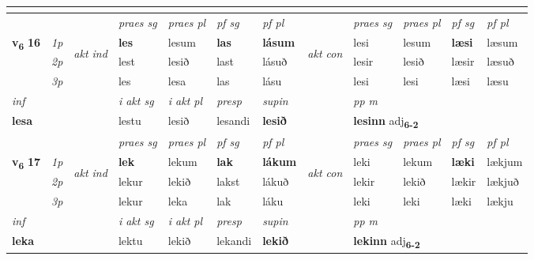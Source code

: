 \begin{longtable}[l]{X>{\footnotesize\itshape}llXXXXlXXXX}
\midrule
  & \\
   \midrule
 & &   & \textit{praes sg}  & \textit{praes pl}    & \textit{ pf sg} & \textit{pf pl} & & \textit{praes sg}  & \textit{praes pl}    & \textit{pf sg} & \textit{pf pl }  \\ \cmidrule{4-7} \cmidrule{9-12}
 \multirow{2}{*}{{{\textbf{v{\textsubscript{6}}} \Large{\textbf{16}}}}}  & 1p & \multirow{3}{*}{\begin{turn}{90}\textit{akt ind}\end{turn}} & \textbf{les} & lesum & \textbf{las} & \textbf{lásum} & \multirow{3}{*}{\begin{turn}{90}\textit{akt con}\end{turn}} &lesi & lesum & \textbf{læsi} & læsum\\*
 & 2p &  &  lest  & lesið & last & lásuð & & lesir & lesið & læsir & læsuð \\*
 & 3p &  & les & lesa & las & lásu & & lesi & lesi& læsi & læsu \\*
\cmidrule{4-7} \cmidrule{9-12}

   {\textit{inf}} & &  & \textit{i akt sg} & \textit{i akt pl}   & \textit{presp} & \textit{supin}  && \textit{pp m} \\*
  {\textbf{lesa}} & && lestu  & lesið   & lesandi &  \textbf{lesið}  && \multicolumn{2}{l}{\textbf{lesinn} adj\textbf{\textsubscript{6-2}}} \\*

\midrule

 & &   & \textit{praes sg}  & \textit{praes pl}    & \textit{ pf sg} & \textit{pf pl} & & \textit{praes sg}  & \textit{praes pl}    & \textit{pf sg} & \textit{pf pl }  \\ \cmidrule{4-7} \cmidrule{9-12}
 \multirow{2}{*}{{{\textbf{v{\textsubscript{6}}} \Large{\textbf{17}}}}}  & 1p & \multirow{3}{*}{\begin{turn}{90}\textit{akt ind}\end{turn}} & \textbf{lek} & lekum & \textbf{lak} & \textbf{lákum} & \multirow{3}{*}{\begin{turn}{90}\textit{akt con}\end{turn}} &leki & lekum & \textbf{læki} & lækjum\\*
 & 2p &  &  lekur  & lekið & lakst & lákuð & & lekir & lekið & lækir & lækjuð \\*
 & 3p &  & lekur & leka & lak & láku & & leki & leki& læki & lækju \\*
\cmidrule{4-7} \cmidrule{9-12}

   {\textit{inf}} & &  & \textit{i akt sg} & \textit{i akt pl}   & \textit{presp} & \textit{supin}  && \textit{pp m} \\*
  {\textbf{leka}} & && lektu  & lekið   & lekandi &  \textbf{lekið}  && \multicolumn{2}{l}{\textbf{lekinn} adj\textbf{\textsubscript{6-2}}} \\*


\end{longtable}
